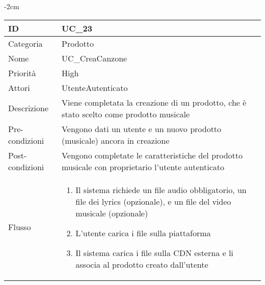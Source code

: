 \begin{center}
\begin{table}[bp]
    \centering
    \addtolength{\leftskip} {-2cm}
\begin{tabular}{ |p{2.6cm}|p{13cm}|  }
\hline
ID & UC\_23\\\hline
Categoria & Prodotto \\\hline
Nome & UC\_CreaCanzone \\\hline
Priorità & High \\\hline
Attori &  UtenteAutenticato \\\hline
Descrizione & Viene completata la creazione di un prodotto, che è stato scelto come prodotto musicale\\\hline
Pre-condizioni &   Vengono dati un utente e un nuovo prodotto (musicale) ancora in creazione\\\hline
Post-condizioni &  Vengono completate le caratteristiche del prodotto musicale con proprietario l'utente autenticato\\\hline
Flusso &  	\vspace{-5mm} \begin{enumerate}
			\item Il sistema richiede un file audio obbligatorio, un file dei lyrics (opzionale), e un file del video musicale (opzionale)
			\item L'utente carica i file sulla piattaforma
			\item Il sistema carica i file sulla CDN esterna e li associa al prodotto creato dall'utente
		\end{enumerate}\\\hline
\end{tabular}
\label{table_use_case:23}\newline
\end{table}


\end{center}
